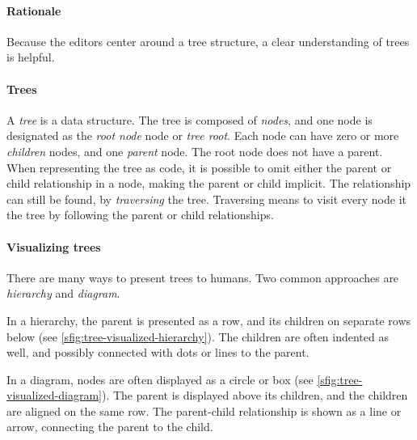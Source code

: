 \paragraph{Rationale}
Because the editors center around a tree structure, a clear understanding of trees is helpful.

\paragraph{Trees}
A \textit{tree} is a data structure.
The tree is composed of \textit{nodes}, and one node is designated as the \textit{root node} node or \textit{tree root}.
Each node can have zero or more \textit{children} nodes, and one \textit{parent} node.
The root node does not have a parent.
When representing the tree as code, it is possible to omit either the parent or child relationship in a node, making the parent or child implicit.
The relationship can still be found, by \textit{traversing} the tree.
Traversing means to visit every node it the tree by following the parent or child relationships.


\paragraph{Visualizing trees}
There are many ways to present trees to humans.
Two common approaches are \textit{hierarchy} and \textit{diagram}.


In a hierarchy, the parent is presented as a row, and its children on separate rows below (see \cref{sfig:tree-visualized-hierarchy}).
The children are often indented as well, and possibly connected with dots or lines to the parent.


In a diagram, nodes are often displayed as a circle or box (see \cref{sfig:tree-visualized-diagram}).
The parent is displayed above its children, and the children are aligned on the same row.
The parent-child relationship is shown as a line or arrow, connecting the parent to the child.


